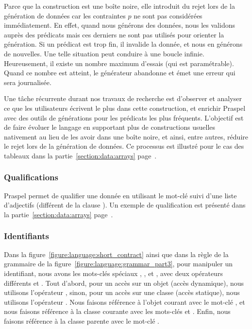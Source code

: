Parce que la construction  est une boîte noire, elle introduit du rejet
lors de la génération de données car les contraintes $p$ ne sont pas considérées
immédiatement. En effet, quand nous générons des données, nous les validons
auprès des prédicats mais ces derniers ne sont pas utilisés pour orienter la
génération. Si un prédicat est trop fin, il invalide la donnée, et nous en
générons de nouvelles. Une telle situation peut conduire à une boucle infinie.
Heureusement, il existe un nombre maximum d'essais (qui est paramétrable). Quand
ce nombre est atteint, le générateur abandonne et émet une erreur qui sera
journalisée.

Une tâche récurrente durant nos travaux de recherche est d'observer et analyser
ce que les utilisateurs écrivent le plus dans cette construction, et enrichir
Praspel avec des outils de générations pour les prédicats les plus fréquents.
L'objectif est de faire évoluer le langage en supportant plus de constructions
usuelles nativement au lieu de les avoir dans une boîte noire, et ainsi, entre
autres, réduire le rejet lors de la génération de données. Ce processus est
illustré pour le cas des tableaux dans la partie~\ref{section:data:arrays}
page~\pageref{section:data:arrays}.

\subsubsection{Qualifications}

Praspel permet de qualifier une donnée en utilisant le mot-clé  suivi
d'une liste d'adjectifs (différent de la clause \ais). Un exemple de
qualification est présenté dans la partie~\ref{section:data:arrays}
page~\pageref{section:data:arrays}.

\subsubsection{Identifiants}

Dans la figure~\ref{figure:language:short_contract} ainsi que dans la règle
 de la grammaire de la
figure~\ref{figure:language:grammar_part3}, pour manipuler un identifiant, nous
avons les mots-clés spéciaux , ,  et
, avec deux opérateurs différents \code{->} et \code{::}. Tout
d'abord, pour un accès sur un objet (accès dynamique), nous utilisons
l'opérateur \code{->}, sinon, pour un accès sur une classe (accès statique),
nous utilisons l'opérateur \code{::}. Nous faisons référence à l'objet courant
avec le mot-clé , et nous faisons référence à la classe courante avec
les mots-clés  et . Enfin, nous faisons référence à la
classe parente avec le mot-clé .

